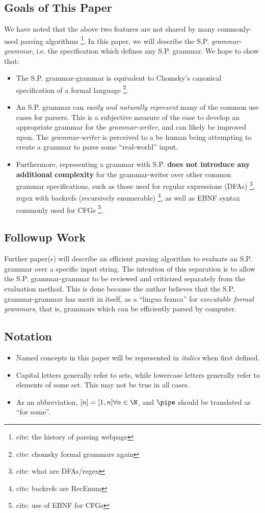\documentclass[10pt]{article}
\newcommand{\todocite}[1]{\footnote{cite: #1}}
\begin{document}
\subsection{Goals of This Paper}
\label{sec:goals}
We have noted that the above two features are not shared by many commonly-used parsing algorithms \todocite{the history of parsing webpage}. In this paper, we will describe the S.P. \textit{grammar-grammar}, i.e. the specification which defines any S.P. grammar. We hope to show that:
\begin{itemize}
  \item The S.P. grammar-grammar is equivalent to Chomsky's canonical specification of a formal language \todocite{chomsky formal grammars again}.
  \item An S.P. grammar can \textit{easily and naturally represent} many of the common use cases for parsers. This is a subjective measure of the ease to develop an appropriate grammar for the \textit{grammar-writer}, and can likely be improved upon. The \textit{grammar-writer} is perceived to a be human being attempting to create a grammar to parse some ``real-world'' input.
  \item Furthermore, representing a grammar with S.P. \textbf{does not introduce any additional complexity} for the grammar-writer over other common grammar specifications, such as those used for regular expressions (DFAs) \todocite{what are DFAs/regex}, regex with backrefs (recursively enumerable) \todocite{backrefs are RecEnum}, as well as EBNF syntax commonly used for CFGs \todocite{use of EBNF for CFGs}.
\end{itemize}

\subsection{Followup Work}
\label{sec:followup-work}
Further paper(s) will describe an efficient parsing algorithm to evaluate an S.P. grammar over a specific input string. The intention of this separation is to allow the S.P. grammar-grammar to be reviewed and criticized separately from the evaluation method. This is done because the author believes that the S.P. grammar-grammar has merit in itself, as a ``lingua franca'' for \textit{executable formal grammars}, that is, grammars which can be efficiently parsed by computer.

\subsection{Notation}
\label{sec:notation}
\begin{itemize}
  \item Named concepts in this paper will be represented in \textit{italics} when first defined.
  \item Capital letters generally refer to sets, while lowercase letters generally refer to elements of some set. This may not be true in all cases.
  \item As an abbreviation, $[n] = [1, n] \forall n \in \N$, and $\pipe$ should be translated as ``for some''.
\end{itemize}
\end{document}
